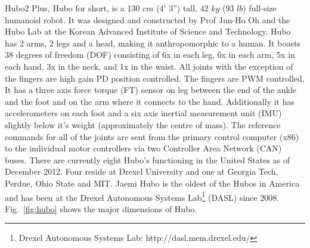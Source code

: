 Hubo2 Plus, Hubo for short, is a 130 $cm$ (4' 3'') tall, 42 $kg$ (93 $lb$) full-size humanoid robot.  
It was designed and constructed by Prof Jun-Ho Oh and the Hubo Lab at the Korean Advanced Institute of Science and Technology\cite{hubo-first}.
Hubo has 2 arms, 2 legs and a head, making it anthropomorphic to a human.  
It boasts 38 degrees of freedom (DOF) consisting of 6x in each leg, 6x in each arm, 5x in each hand, 3x in the neck, and 1x in the waist.
All joints with the exception of the fingers are high gain PD position controlled.
The fingers are PWM controlled.
It has a three axis force torque (FT) sensor on leg between the end of the ankle and the foot and on the arm where it connects to the hand.
Additionally it has accelerometers on each foot and a six axis inertial measurement unit (IMU) slightly below it's weight (approximately the centre of mass).
The reference commands for all of the joints are sent from the primary control computer (x86) to the individual motor controllers via two Controller Area Network (CAN) buses.
There are currently eight Hubo's functioning in the United States as of December 2012.
Four reside at Drexel University and one at Georgia Tech, Perdue, Ohio State and MIT.
Jaemi Hubo is the oldest of the Hubos in America and has been at the Drexel Autonomous Systems Lab\footnote{Drexel Autonomous Systems Lab: http://dasl.mem.drexel.edu/} (DASL) since 2008\cite{jaemiHuboSRM}.
Fig.~\ref{fig:hubo} shows the major dimensions of Hubo.

